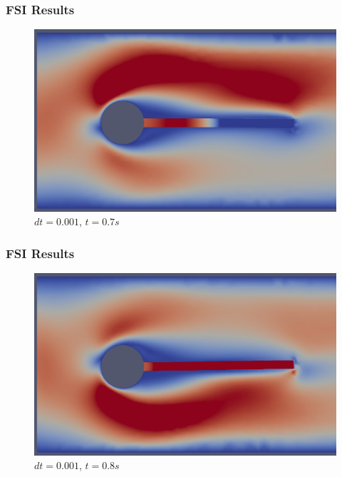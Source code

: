 \documentclass{beamer}
\begin{document}
\begin{frame}
\frametitle{FSI Results}
\begin{figure}[h]
\centering
	\includegraphics[width=\textwidth]{t_700}
	\caption{ $dt = 0.001$, $t = 0.7s$}
	\label{fig:t_700}
\end{figure}
\end{frame}

\begin{frame}
\frametitle{FSI Results}
\begin{figure}[h]
\centering
	\includegraphics[width=\textwidth]{t_800}
	\caption{ $dt = 0.001$, $t = 0.8s$}
	\label{fig:t_800}
\end{figure}
\end{frame}
\end{document}

